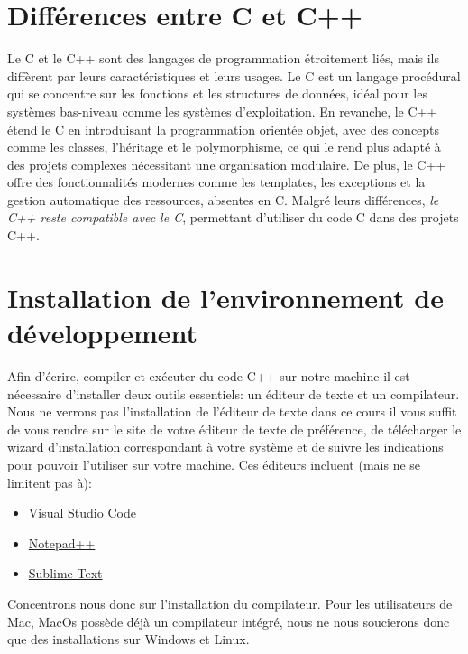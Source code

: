 \section{Différences entre C et C++}
Le C et le C++ sont des langages de programmation étroitement liés, mais ils diffèrent par leurs caractéristiques et leurs usages. Le C est un langage procédural qui se concentre sur les fonctions et les structures de données, idéal pour les systèmes bas-niveau comme les systèmes d'exploitation. En revanche, le C++ étend le C en introduisant la programmation orientée objet, avec des concepts comme les classes, l'héritage et le polymorphisme, ce qui le rend plus adapté à des projets complexes nécessitant une organisation modulaire. De plus, le C++ offre des fonctionnalités modernes comme les templates, les exceptions et la gestion automatique des ressources, absentes en C. Malgré leurs différences, \emph{le C++ reste compatible avec le C}, permettant d'utiliser du code C dans des projets C++.

\section{Installation de l'environnement de développement}
Afin d'écrire, compiler et exécuter du code C++ sur notre machine il est nécessaire d'installer deux outils essentiels: un éditeur de texte et un compilateur. Nous ne verrons pas l'installation de l'éditeur de texte dans ce cours il vous suffit de vous rendre sur le site de votre éditeur de texte de préférence, de télécharger le wizard d'installation correspondant à votre système et de suivre les indications pour pouvoir l'utiliser sur votre machine. Ces éditeurs incluent (mais ne se limitent pas à):

\begin{itemize}
	\item \href{https://code.visualstudio.com/Download}{Visual Studio Code}
	\item \href{https://notepad-plus-plus.org/downloads/v8.7.4/}{Notepad++}
	\item \href{https://www.sublimetext.com/download}{Sublime Text}
\end{itemize}

Concentrons nous donc sur l'installation du compilateur. Pour les utilisateurs de Mac, MacOs possède déjà un compilateur intégré, nous ne nous soucierons donc que des installations sur Windows et Linux.

